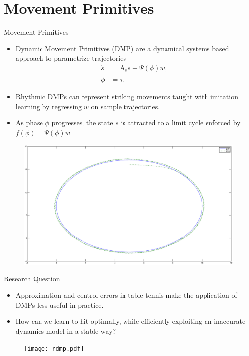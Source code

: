\documentclass[handout]{beamer}
\newcommand{\boldvec}[1]{\boldsymbol{\mathrm{#1}}}
\let\vec\boldvec
\newcommand{\dmp}{s} %
\newcommand{\force}{\mathit{f}} %
\newcommand{\phase}{\phi} %
\newcommand{\weights}{w} %
\newcommand{\basis}{\Psi} %
\begin{document}
\section{Movement Primitives}
%
\begin{frame}{Movement Primitives}
\begin{itemize}
\item Dynamic Movement Primitives (DMP) are a dynamical systems based approach to parametrize trajectories
\begin{equation}
\begin{aligned}
\dot{\dmp} &= \vec{A}_s \dmp + \basis(\phase) \weights, \\
\dot{\phase} &= \tau.
\label{dmp1}
\end{aligned}
\end{equation}
\item Rhythmic DMPs can represent striking movements taught with imitation learning by regressing $\weights$ on sample trajectories.
\item As phase $\phase$ progresses, the state $\dmp$ is attracted to a limit cycle enforced by $\force(\phase) = \basis(\phase)\weights$
\end{itemize}
\begin{figure}
\center
\includegraphics[scale=0.15]{rdmp0.eps}			
\end{figure}
\end{frame}
%
\begin{frame}{Research Question}

\begin{itemize}
\item Approximation and control errors in table tennis make the application of DMPs less useful in practice.
\item How can we learn to hit optimally, while efficiently exploiting an inaccurate dynamics model in a stable
way?
\end{itemize}
\begin{figure}
\center
\texttt{[image: rdmp.pdf]}			
\end{figure}
\end{frame}
%
\end{document}
